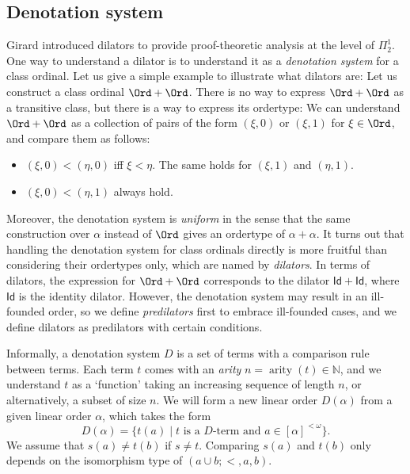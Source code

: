\documentclass{mhkr}
\newcommand{\added}[1]{#1}
\newcommand{\bbN}{\mathbb{N}}
\newcommand{\arity}{\operatorname{arity}}
\begin{document}
\subsection{Denotation system}
Girard introduced dilators to provide proof-theoretic analysis at the level of $\Pi^1_2$. 
One way to understand a dilator is to understand it as a \emph{denotation system} for a class ordinal. Let us give a simple example to illustrate what dilators are: Let us construct a class ordinal $\Ord+\Ord$. There is no way to express $\Ord+\Ord$ as a transitive class, but there is a way to express its ordertype: We can understand $\Ord+\Ord$ as a collection of pairs of the form $(\xi,0)$ or $(\xi,1)$ for $\xi\in \Ord$, and compare them as follows:
\begin{itemize}
    \item $(\xi,0) < (\eta,0)$ iff $\xi<\eta$. The same holds for $(\xi,1)$ and $(\eta,1)$.
    \item $(\xi,0)< (\eta,1)$ always hold.
\end{itemize}
Moreover, the denotation system is \emph{uniform} in the sense that the same construction over $\alpha$ instead of $\Ord$ gives an ordertype of $\alpha+\alpha$. It turns out that handling the denotation system for class ordinals directly is more fruitful than considering their ordertypes only, which are named by \emph{dilators}. In terms of dilators, the expression for $\Ord+\Ord$ corresponds to the dilator $\mathsf{Id}+\mathsf{Id}$, where $\mathsf{Id}$ is the identity dilator. 
However, the denotation system may result in an ill-founded order, so we define \emph{predilators} first to embrace ill-founded cases, and we define dilators as predilators with certain conditions.

Informally, a denotation system $D$ is a set of terms with a comparison rule between terms. Each term $t$ comes with an \emph{arity} $n=\arity(t)\in \bbN$, and we understand $t$ as a `function' taking an increasing sequence of length $n$, or alternatively, a subset of size $n$. We will form a new linear order $D(\alpha)$ from a given linear order $\alpha$, which takes the form
\begin{equation*}
    D(\alpha) = \{t(a) \mid \text{$t$ is a $D$-term and }a \in [\alpha]^{<\omega}\}.
\end{equation*}
We assume that $s(a)\neq t(b)$ if $s\neq t$. Comparing $s(a)$ and $t(b)$ only depends on the \added{isomorphism type of $(a\cup b;<,a,b)$.}

\end{document}
